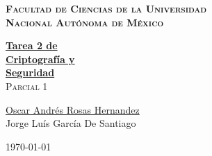 \documentclass[12pt, fleqn]{report}                             %
\author{Oscar Andrés Rosas}                                     %
\theoremstyle{break}                                            %
\begin{document}
\begin{titlepage}

    \pagecolor{TitlePageColor}                                      %
    \color{white}                                                   %

    \vspace                                                         %
    \baselineskip                                                   %

    \makebox[0pt][l]{\rule{1.3\textwidth}{3pt}}                     %

    \textbf{\textsc{\Large Facultad de Ciencias de la Universidad \\ Nacional Autónoma de México}}                %
    \vspace{2.7cm}                                                  %

    \href{ProjectNameLink/Book}                                     %
    {\fontsize{55}{68}\selectfont \textbf{Tarea 2 de  \\[0.4cm] Criptografía y \\[0.4cm] Seguridad}}\\[0.5cm]     %
    \textcolor{ColorSubtext}{\textsc{\Huge Parcial 1}}              %

    \vfill                                                          %

    \href{https://soyoscarrh.github.io/}                            %
    {\LARGE \textsf{Oscar Andrés Rosas Hernandez}} \\[0.5cm]        %
    {\LARGE \textsf{Jorge Luís García De Santiago}}                 %

    \vspace                                                         %
    \baselineskip                                                   %

    {\large \textsf{\today}}                                  %

\end{titlepage}
\end{document}
